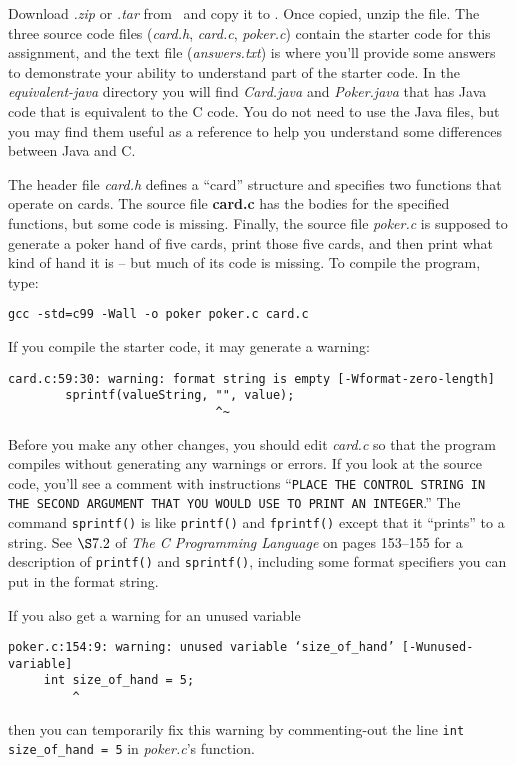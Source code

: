 Download \textit{\shortlabname.zip} or \textit{\shortlabname.tar} from \filesource\ and copy it to \runtimeenvironment.
Once copied, unzip the file.
The three source code files (\textit{card.h}, \textit{card.c}, \textit{poker.c}) contain the starter code for this assignment, and the text file (\textit{answers.txt}) is where you'll provide some answers to demonstrate your ability to understand part of the starter code.
In the \mbox{\textit{equivalent-java}} directory you will find \textit{Card.java} and \textit{Poker.java} that has Java code that is equivalent to the C code.
You do not need to use the Java files, but you may find them useful as a reference to help you understand some differences between Java and C\@.

The header file \textit{card.h} defines a ``card'' structure and specifies two functions that operate on cards.
The source file \textbf{card.c} has the bodies for the specified functions, but some code is missing.
Finally, the source file \textit{poker.c} is supposed to generate a poker hand of five cards, print those five cards, and then print what kind of hand it is -- but much of its code is missing.
To compile the program, type:

\texttt{gcc -std=c99 -Wall -o poker poker.c card.c}

If you compile the starter code, it may generate a warning:

\begin{verbatim}
card.c:59:30: warning: format string is empty [-Wformat-zero-length]
        sprintf(valueString, "", value);
                             ^~
\end{verbatim}

Before you make any other changes, you should edit \textit{card.c} so that the program compiles without generating any warnings or errors.
If you look at the source code, you'll see a comment with instructions ``\texttt{PLACE THE CONTROL STRING IN THE SECOND ARGUMENT THAT YOU WOULD USE TO PRINT AN INTEGER}.''
The command \lstinline{sprintf()} is like \lstinline{printf()} and \lstinline{fprintf()} except that it ``prints'' to a string.
See $\S7.2$ of \textit{The C Programming Language} on pages 153--155 for a description of \lstinline{printf()} and \lstinline{sprintf()}, including some format specifiers you can put in the format string.

If you also get a warning for an unused variable
\begin{verbatim}
poker.c:154:9: warning: unused variable ‘size_of_hand’ [-Wunused-variable]
     int size_of_hand = 5;
         ^
\end{verbatim}
then you can temporarily fix this warning by commenting-out the line \lstinline{int size_of_hand = 5} in \textit{poker.c}'s  function.

